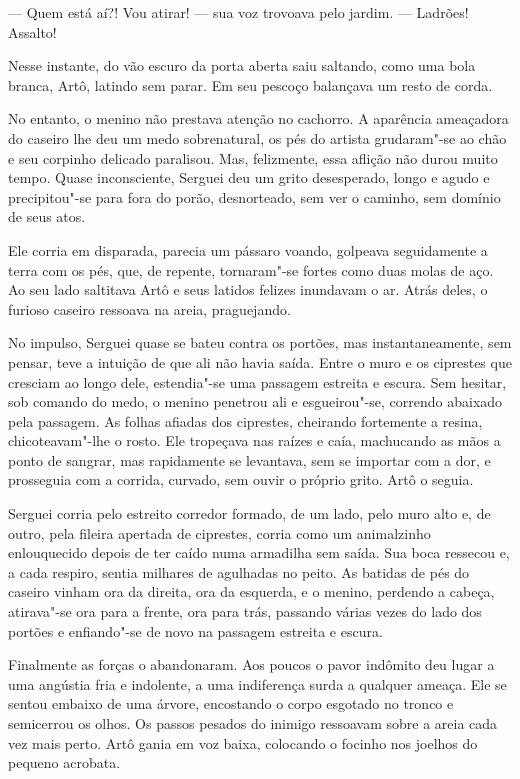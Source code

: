 --- Quem está aí?! Vou atirar! --- sua voz trovoava pelo jardim. ---
Ladrões! Assalto!

Nesse instante, do vão escuro da porta aberta saiu saltando, como uma
bola branca, Artô, latindo sem parar. Em seu pescoço balançava um resto
de corda.

No entanto, o menino não prestava atenção no cachorro. A aparência
ameaçadora do caseiro lhe deu um medo sobrenatural, os pés do artista
grudaram"-se ao chão e seu corpinho delicado paralisou. Mas, felizmente,
essa aflição não durou muito tempo. Quase inconsciente, Serguei deu um
grito desesperado, longo e agudo e precipitou"-se para fora do porão,
desnorteado, sem ver o caminho, sem domínio de seus atos.

Ele corria em disparada, parecia um pássaro voando, golpeava
seguidamente a terra com os pés, que, de repente, tornaram"-se fortes
como duas molas de aço. Ao seu lado saltitava Artô e seus latidos
felizes inundavam o ar. Atrás deles, o furioso caseiro ressoava na
areia, praguejando.

No impulso, Serguei quase se bateu contra os portões, mas
instantaneamente, sem pensar, teve a intuição de que ali não havia
saída. Entre o muro e os ciprestes que cresciam ao longo dele,
estendia"-se uma passagem estreita e escura. Sem hesitar, sob comando do
medo, o menino penetrou ali e esgueirou"-se, correndo abaixado pela
passagem. As folhas afiadas dos ciprestes, cheirando fortemente a
resina, chicoteavam"-lhe o rosto. Ele tropeçava nas raízes e caía,
machucando as mãos a ponto de sangrar, mas rapidamente se levantava, sem
se importar com a dor, e prosseguia com a corrida, curvado, sem ouvir o
próprio grito. Artô o seguia.

Serguei corria pelo estreito corredor formado, de um lado, pelo muro
alto e, de outro, pela fileira apertada de ciprestes, corria como um
animalzinho enlouquecido depois de ter caído numa armadilha sem saída.
Sua boca ressecou e, a cada respiro, sentia milhares de agulhadas no
peito. As batidas de pés do caseiro vinham ora da direita, ora da
esquerda, e o menino, perdendo a cabeça, atirava"-se ora para a frente,
ora para trás, passando várias vezes do lado dos portões e enfiando"-se
de novo na passagem estreita e escura.

Finalmente as forças o abandonaram. Aos poucos o pavor indômito deu
lugar a uma angústia fria e indolente, a uma indiferença surda a
qualquer ameaça. Ele se sentou embaixo de uma árvore, encostando o corpo
esgotado no tronco e semicerrou os olhos. Os passos pesados do inimigo
ressoavam sobre a areia cada vez mais perto. Artô gania em voz baixa,
colocando o focinho nos joelhos do pequeno acrobata.

